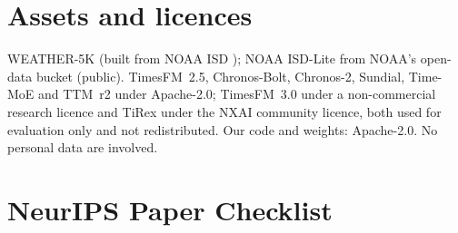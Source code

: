 \documentclass{article}
\begin{document}
\section{Assets and licences}
\label{app:assets}
WEATHER-5K \citep{han2026weather5k} (built from NOAA ISD \citep{smith2011isd}); NOAA ISD-Lite from NOAA's open-data
bucket (public). TimesFM~2.5, Chronos-Bolt, Chronos-2, Sundial, Time-MoE and TTM~r2 under Apache-2.0; TimesFM~3.0 under
a non-commercial research licence and TiRex under the NXAI community licence, both used for evaluation only and not
redistributed. Our code and weights: Apache-2.0. No personal data are involved.

\newpage
\section*{NeurIPS Paper Checklist}
\end{document}
